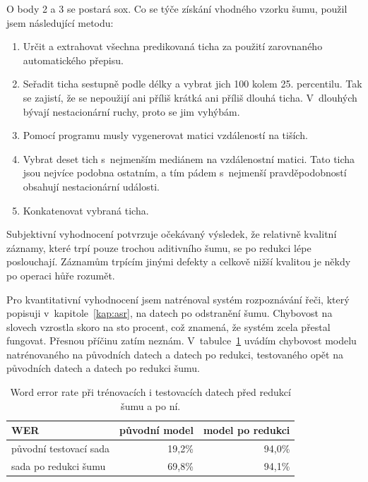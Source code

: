 O body 2 a 3 se postará sox. Co se týče získání vhodného vzorku šumu, použil jsem
následující metodu:
\begin{enumerate}
\item{
    Určit a extrahovat všechna predikovaná ticha za použití zarovnaného
    automatického přepisu.
}
\item{
    Seřadit ticha sestupně podle délky a vybrat jich 100 kolem 25. percentilu.
    Tak se zajistí, že se nepoužijí ani příliš krátká ani příliš dlouhá ticha.
    V~dlouhých bývají nestacionární ruchy, proto se jim vyhýbám.
}
\item{
    Pomocí programu musly vygenerovat matici vzdáleností na tiších.
}
\item{
    Vybrat deset tich s~nejmenším mediánem na vzdálenostní matici. Tato ticha
    jsou nejvíce podobna ostatním, a tím pádem s~nejmenší pravděpodobností
    obsahují nestacionární události.
}
\item{
    Konkatenovat vybraná ticha.
}
\end{enumerate}

Subjektivní vyhodnocení potvrzuje očekávaný výsledek, že relativně kvalitní
záznamy, které trpí pouze trochou aditivního šumu, se po redukci lépe
poslouchají. Záznamům trpícím jinými defekty a celkově nižší kvalitou je někdy po
operaci hůře rozumět.

Pro kvantitativní vyhodnocení jsem natrénoval systém rozpoznávání řeči, který
popisuji v~kapitole~\ref{kap:asr}, na datech po odstranění šumu. Chybovost na
slovech vzrostla skoro na sto procent, což znamená, že systém zcela přestal
fungovat. Přesnou příčinu zatím neznám.
V~tabulce~\ref{tab:results-denoise} uvádím chybovost modelu natrénovaného na
původních datech a datech po redukci, testovaného opět na původních datech a
datech po redukci šumu.

\begin{table}[htpb]
\begin{center}
\begin{tabular}{|l||r|r|}
\hline
WER    & původní model & model po redukci \\
\hline
původní testovací sada & 19,2\% & 94,0\% \\
sada po redukci šumu   & 69,8\% & 94,1\% \\
\hline
\end{tabular}
\caption{Word error rate při trénovacích i testovacích datech před redukcí šumu
a po ní.}\label{tab:results-denoise}
\end{center}
\end{table}

